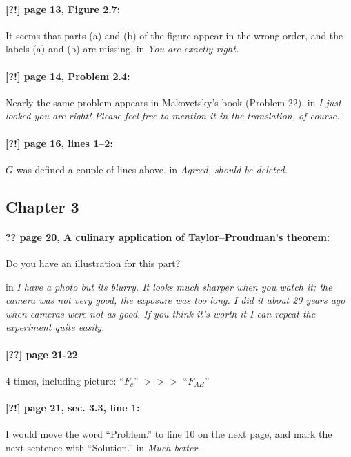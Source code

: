 \documentclass[twoside]{article}
\begin{document}
\paragraph{[?!] page 13, Figure 2.7:}
It seems that parts (a) and (b) of the figure appear in the wrong order, and the labels (a) and (b) are missing.
 in {\it  You are exactly right.}

\paragraph{[?!] page 14, Problem 2.4:}
Nearly the same problem appears in Makovetsky’s book (Problem 22).
 in {\it I just looked-you are right! Please feel free to mention it in the translation, of course. } 

\paragraph{[?!] page 16, lines 1--2:} $G$ was defined a couple of lines above.
 in {\it Agreed, should be deleted.}

\subsection*{Chapter 3}

\paragraph{?? page 20, A culinary application of Taylor--Proudman’s theorem:} Do you have an illustration for this part? 

 in {\it I have a photo but its blurry. It looks much sharper when you watch it; the camera was not very good, the exposure was too long. I did it about 20 years ago when cameras were not as good. If you think it's worth it I can repeat the experiment quite easily.}

\paragraph{[??] page 21-22}  4 times, including picture: ``$F_c$'' $>\!>\!>$ ``$F_{AB}$''

\paragraph{[?!] page 21, sec. 3.3, line 1:}
I would move the word “Problem.” to line 10 on the next page, and mark the next sentence with “Solution.”
 in {\it Much better.}
\end{document}
